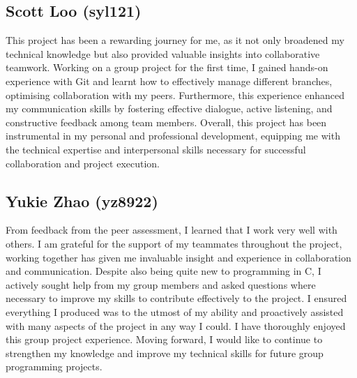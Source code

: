 \documentclass{article}
\begin{document}
\begin{adjustwidth}{2em}{0pt}
        \subsection{Scott Loo (syl121)}
       This project has been a rewarding journey for me, as it not only broadened my technical knowledge but also provided valuable insights into collaborative teamwork. Working on a group project for the first time, I gained hands-on experience with Git and learnt how to effectively manage different branches, optimising collaboration with my peers. Furthermore, this experience enhanced my communication skills by fostering effective dialogue, active listening, and constructive feedback among team members. Overall, this project has been instrumental in my personal and professional development, equipping me with the technical expertise and interpersonal skills necessary for successful collaboration and project execution.
       
        \subsection{Yukie Zhao (yz8922)}
        From feedback from the peer assessment, I learned that I work very well with others. I am grateful for the support of my teammates throughout the project, working together has given me invaluable insight and experience in collaboration and communication. Despite also being quite new to programming in C, I actively sought help from my group members and asked questions where necessary to improve my skills to contribute effectively to the project. I ensured everything I produced was to the utmost of my ability and proactively assisted with many aspects of the project in any way I could. I have thoroughly enjoyed this group project experience. Moving forward, I would like to continue to strengthen my knowledge and improve my technical skills for future group programming projects.
    
    \end{adjustwidth}
    
    
\end{document}
